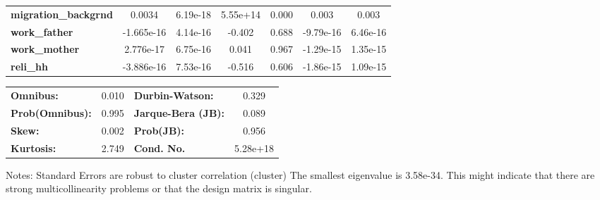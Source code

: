 \begin{center}
\begin{tabular}{lcccccc}
\textbf{migration\_backgrnd}             &       0.0034  &     6.19e-18     &  5.55e+14  &         0.000        &        0.003    &        0.003     \\
\textbf{work\_father}                    &   -1.665e-16  &     4.14e-16     &    -0.402  &         0.688        &    -9.79e-16    &     6.46e-16     \\
\textbf{work\_mother}                    &    2.776e-17  &     6.75e-16     &     0.041  &         0.967        &    -1.29e-15    &     1.35e-15     \\
\textbf{reli\_hh}                        &   -3.886e-16  &     7.53e-16     &    -0.516  &         0.606        &    -1.86e-15    &     1.09e-15     \\
\bottomrule
\end{tabular}
\begin{tabular}{lclc}
\textbf{Omnibus:}       &  0.010 & \textbf{  Durbin-Watson:     } &    0.329  \\
\textbf{Prob(Omnibus):} &  0.995 & \textbf{  Jarque-Bera (JB):  } &    0.089  \\
\textbf{Skew:}          &  0.002 & \textbf{  Prob(JB):          } &    0.956  \\
\textbf{Kurtosis:}      &  2.749 & \textbf{  Cond. No.          } & 5.28e+18  \\
\bottomrule
\end{tabular}
\end{center}

Notes: \newline
 [1] Standard Errors are robust to cluster correlation (cluster) \newline
 [2] The smallest eigenvalue is 3.58e-34. This might indicate that there are \newline
 strong multicollinearity problems or that the design matrix is singular.
